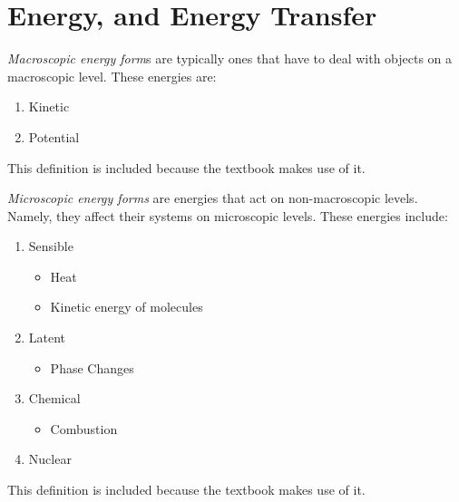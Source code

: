 \section{Energy, and Energy Transfer}\label{sec:Energy_Energy_Transfer}
\begin{definition}\label{def:Macroscopic_Energy_Form}
  \emph{Macroscopic energy form}s are typically ones that have to deal with objects on a macroscopic level.
  These energies are:
  \begin{enumerate}[noitemsep]
  \item Kinetic
  \item Potential
  \end{enumerate}

  \begin{remark}
    This definition is included because the textbook makes use of it.
  \end{remark}
\end{definition}

\begin{definition}\label{def:Microscopic_Energy_Form}
  \emph{Microscopic energy forms} are energies that act on non-macroscopic levels.
  Namely, they affect their systems on microscopic levels.
  These energies include:
  \begin{enumerate}[noitemsep]
  \item Sensible
    \begin{itemize}[noitemsep]
    \item Heat
    \item Kinetic energy of molecules
    \end{itemize}
  \item Latent
    \begin{itemize}[noitemsep]
    \item Phase Changes
    \end{itemize}
  \item Chemical
    \begin{itemize}[noitemsep]
    \item Combustion
    \end{itemize}
  \item Nuclear
  \end{enumerate}

  \begin{remark}
    This definition is included because the textbook makes use of it.
  \end{remark}
\end{definition}

